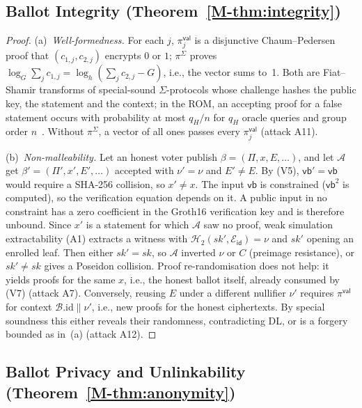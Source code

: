\documentclass[10pt,letterpaper,journal]{IEEEtran}
\begin{document}
\subsection{Ballot Integrity (Theorem~\ref{M-thm:integrity})}
\label{sec:supp-proof-integrity}

\begin{proof}
(a)~\emph{Well-formedness.} For each $j$, $\pi^{\mathsf{val}}_j$ is a disjunctive Chaum--Pedersen proof that $(c_{1,j}, c_{2,j})$ encrypts $0$ or $1$; $\pi^{\Sigma}$ proves $\log_G \sum_j c_{1,j} = \log_h (\sum_j c_{2,j} - G)$, i.e., the vector sums to~1. Both are Fiat--Shamir transforms of special-sound $\Sigma$-protocols whose challenge hashes the public key, the statement and the context; in the ROM, an accepting proof for a false statement occurs with probability at most $q_H/n$ for $q_H$ oracle queries and group order $n$~\cite{Bernhard2012}. Without $\pi^{\Sigma}$, a vector of all ones passes every $\pi^{\mathsf{val}}_j$ (attack A11).

(b)~\emph{Non-malleability.} Let an honest voter publish $\beta = (\Pi, x, E, \ldots)$, and let $\mathcal{A}$ get $\beta' = (\Pi', x', E', \ldots)$ accepted with $\nu' = \nu$ and $E' \neq E$. By (V5), $\mathsf{vb}' = \mathsf{vb}$ would require a SHA-256 collision, so $x' \neq x$. The input $\mathsf{vb}$ is constrained ($\mathsf{vb}^2$ is computed), so the verification equation depends on it. A public input in no constraint has a zero coefficient in the Groth16 verification key and is therefore unbound. Since $x'$ is a statement for which $\mathcal{A}$ saw no proof, weak simulation extractability (A1) extracts a witness with $\mathcal{H}_2(sk', \mathcal{E}_{\mathsf{id}}) = \nu$ and $sk'$ opening an enrolled leaf. Then either $sk' = sk$, so $\mathcal{A}$ inverted $\nu$ or $C$ (preimage resistance), or $sk' \neq sk$ gives a Poseidon collision. Proof re-randomisation does not help: it yields proofs for the same $x$, i.e., the honest ballot itself, already consumed by (V7) (attack A7). Conversely, reusing $E$ under a different nullifier $\nu'$ requires $\pi^{\mathsf{val}}$ for context $\mathcal{B}.\mathrm{id}\|\nu'$, i.e., new proofs for the honest ciphertexts. By special soundness this either reveals their randomness, contradicting DL, or is a forgery bounded as in~(a) (attack A12).
\end{proof}

\subsection{Ballot Privacy and Unlinkability (Theorem~\ref{M-thm:anonymity})}
\label{sec:supp-proof-anonymity}
\end{document}
